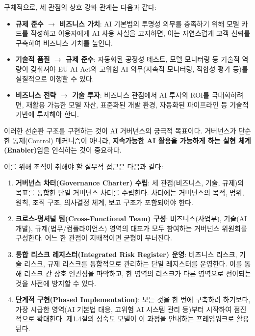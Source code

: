 구체적으로, 세 관점의 상호 강화 관계는 다음과 같다:

\begin{itemize}
    \item \textbf{규제 준수 $\rightarrow$ 비즈니스 가치}: AI 기본법의 투명성 의무를 충족하기 위해 모델 카드를 작성하고 이용자에게 AI 사용 사실을 고지하면, 이는 자연스럽게 고객 신뢰를 구축하여 비즈니스 가치를 높인다.
    \item \textbf{기술적 품질 $\rightarrow$ 규제 준수}: 자동화된 공정성 테스트, 모델 모니터링 등 기술적 역량이 갖춰져야 EU AI Act의 고위험 AI 의무(지속적 모니터링, 적합성 평가 등)를 실질적으로 이행할 수 있다.
    \item \textbf{비즈니스 전략 $\rightarrow$ 기술 투자}: 비즈니스 관점에서 AI 투자의 ROI를 극대화하려면, 재활용 가능한 모델 자산, 표준화된 개발 환경, 자동화된 파이프라인 등 기술적 기반에 투자해야 한다.
\end{itemize}

이러한 선순환 구조를 구현하는 것이 AI 거버넌스의 궁극적 목표이다. 거버넌스가 단순한 통제(Control) 메커니즘이 아니라, \textbf{지속가능한 AI 활용을 가능하게 하는 실현 체계(Enabler)}임을 인식하는 것이 중요하다.

이를 위해 조직이 취해야 할 실무적 접근은 다음과 같다:

\begin{enumerate}
    \item \textbf{거버넌스 차터(Governance Charter) 수립}: 세 관점(비즈니스, 기술, 규제)의 목표를 통합한 단일 거버넌스 차터를 수립한다. 차터에는 거버넌스의 목적, 범위, 원칙, 조직 구조, 의사결정 체계, 보고 구조가 포함되어야 한다.
    \item \textbf{크로스-펑셔널 팀(Cross-Functional Team) 구성}: 비즈니스(사업부), 기술(AI 개발), 규제(법무/컴플라이언스) 영역의 대표가 모두 참여하는 거버넌스 위원회를 구성한다. 어느 한 관점이 지배적이면 균형이 무너진다.
    \item \textbf{통합 리스크 레지스터(Integrated Risk Register) 운영}: 비즈니스 리스크, 기술 리스크, 규제 리스크를 통합적으로 관리하는 단일 레지스터를 운영한다. 이를 통해 리스크 간 상호 연관성을 파악하고, 한 영역의 리스크가 다른 영역으로 전이되는 것을 사전에 방지할 수 있다.
    \item \textbf{단계적 구현(Phased Implementation)}: 모든 것을 한 번에 구축하려 하기보다, 가장 시급한 영역(AI 기본법 대응, 고위험 AI 시스템 관리 등)부터 시작하여 점진적으로 확대한다. 제1.4절의 성숙도 모델이 이 과정을 안내하는 프레임워크로 활용된다.
\end{enumerate}

